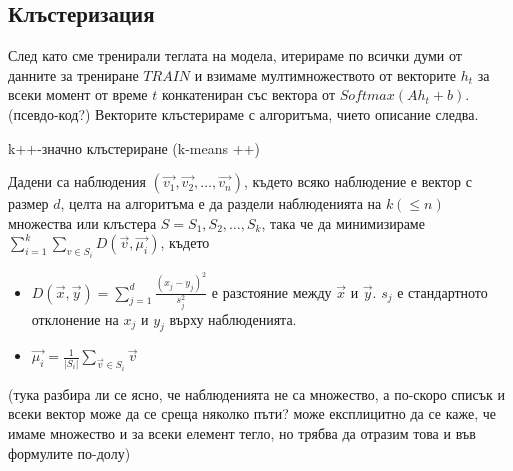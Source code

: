 \documentclass[a4paper,12pt]{article}
\begin{document}
\subsection{Клъстеризация}

След като сме тренирали теглата на модела, итерираме по всички думи от данните за трениране $TRAIN$ и взимаме мултимножеството от векторите $h_t$ за всеки момент от време $t$ конкатениран със вектора от $Softmax( A h_t + b )$. (псевдо-код?) Векторите клъстерираме с алгоритъма, чието описание следва.

k++-значно клъстериране (k-means ++)

Дадени са наблюдения $(\vec{v_1}, \vec{v_2},\ldots, \vec{v_n})$, където всяко наблюдение е вектор с размер $d$, целта на алгоритъма е да раздели наблюденията на $k ( \leq n )$ множества или клъстера $S = {S_1, S_2,\ldots, S_k}$, така че да минимизираме $\displaystyle\sum_{i=1}^{k} \sum_{v \in S_i} D(\vec{v}, \vec{\mu_i})$, където 

\begin{itemize}
 \item $D(\vec{x}, \vec{y}) = \displaystyle\sum_{j=1}^{d} \frac{(x_j - y_j)^2}{s_j^2}$ е разстояние между $\vec{x}$ и $\vec{y}$. $s_j$ е стандартното отклонение на $x_j$ и $y_j$ върху наблюденията.
 \item $\vec{\mu_i} = \frac{1}{|S_i|} \displaystyle\sum_{\vec{v} \in S_i}{\vec{v}}$
\end{itemize}

(тука разбира ли се ясно, че наблюденията не са множество, а по-скоро списък и всеки вектор може да се среща няколко пъти? може експлицитно да се каже, че имаме множество и за всеки елемент тегло, но трябва да отразим това и във формулите по-долу)
\end{document}
